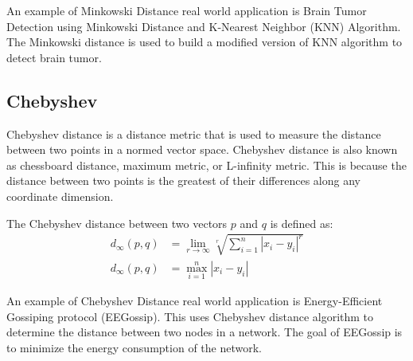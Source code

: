 \documentclass[12pt,titlepage]{article}
\begin{document}
An example of Minkowski Distance real world application is Brain Tumor Detection using Minkowski Distance and K-Nearest Neighbor (KNN) Algorithm.
The Minkowski distance is used to build a modified version of KNN algorithm to detect brain tumor.

\subsection*{Chebyshev}
Chebyshev distance is a distance metric that is used to measure the distance between two points in a normed vector space.
Chebyshev distance is also known as chessboard distance, maximum metric, or L-infinity metric. This is because the distance
between two points is the greatest of their differences along any coordinate dimension.

The Chebyshev distance between two vectors $p$ and $q$ is defined as:
\begin{align*}
    d_{\infty}(p, q) &= \lim_{r \rightarrow \infty} \sqrt[r]{\sum_{i=1}^{n} |x_i - y_i|^r} \\
    d_{\infty}(p, q) &= \max_{i=1}^{n} |x_i - y_i|
\end{align*}

An example of Chebyshev Distance real world application is Energy-Efficient Gossiping protocol (EEGossip).
This uses Chebyshev distance algorithm to determine the distance between two nodes in a network.
The goal of EEGossip is to minimize the energy consumption of the network.
\end{document}
